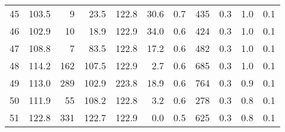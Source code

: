 \begin{tabular}{|r|rrrrr|rrrrr|}
45 & 103.5 & 9 & 23.5 & 122.8 & 30.6 & 0.7 & 435 & 0.3 & 1.0 & 0.1 \\
46 & 102.9 & 10 & 18.9 & 122.9 & 34.0 & 0.6 & 424 & 0.3 & 1.0 & 0.1 \\
47 & 108.8 & 7 & 83.5 & 122.8 & 17.2 & 0.6 & 482 & 0.3 & 1.0 & 0.1 \\
48 & 114.2 & 162 & 107.5 & 122.9 & 2.7 & 0.6 & 685 & 0.3 & 1.0 & 0.1 \\
49 & 113.0 & 289 & 102.9 & 223.8 & 18.9 & 0.6 & 764 & 0.3 & 0.9 & 0.1 \\
50 & 111.9 & 55 & 108.2 & 122.8 & 3.2 & 0.6 & 278 & 0.3 & 0.8 & 0.1 \\
51 & 122.8 & 331 & 122.7 & 122.9 & 0.0 & 0.5 & 625 & 0.3 & 0.8 & 0.1 \\
\hline
\end{tabular}
